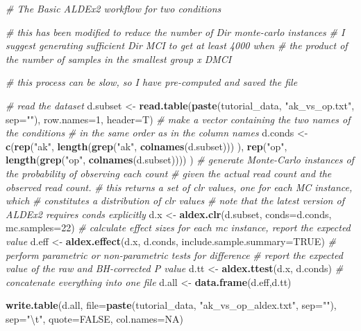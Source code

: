 \documentclass[onecolumn]{article}
\newenvironment{Shaded}{\begin{snugshade}}{\end{snugshade}}
\newcommand{\CharTok}[1]{\textcolor[rgb]{0.31,0.60,0.02}{#1}}
\newcommand{\CommentTok}[1]{\textcolor[rgb]{0.56,0.35,0.01}{\textit{#1}}}
\newcommand{\DataTypeTok}[1]{\textcolor[rgb]{0.13,0.29,0.53}{#1}}
\newcommand{\DecValTok}[1]{\textcolor[rgb]{0.00,0.00,0.81}{#1}}
\newcommand{\KeywordTok}[1]{\textcolor[rgb]{0.13,0.29,0.53}{\textbf{#1}}}
\newcommand{\NormalTok}[1]{#1}
\newcommand{\OtherTok}[1]{\textcolor[rgb]{0.56,0.35,0.01}{#1}}
\newcommand{\StringTok}[1]{\textcolor[rgb]{0.31,0.60,0.02}{#1}}
\begin{document}
\begin{Shaded}
\begin{Highlighting}[]
\CommentTok{# The Basic ALDEx2 workflow for two conditions}

\CommentTok{# this has been modified to reduce the number of Dir monte-carlo instances}
\CommentTok{# I suggest generating sufficient Dir MCI to get at least 4000 when}
\CommentTok{# the product of the number of samples in the smallest group x DMCI}

\CommentTok{# this process can be slow, so I have pre-computed and saved the file}


\CommentTok{# read the dataset}
\NormalTok{d.subset <-}\StringTok{ }\KeywordTok{read.table}\NormalTok{(}\KeywordTok{paste}\NormalTok{(tutorial_data, }\StringTok{"ak_vs_op.txt"}\NormalTok{, }\DataTypeTok{sep=}\StringTok{""}\NormalTok{),}
    \DataTypeTok{row.names=}\DecValTok{1}\NormalTok{, }\DataTypeTok{header=}\NormalTok{T)}
\CommentTok{# make a vector containing the two names of the conditions}
\CommentTok{# in the same order as in the column names}
\NormalTok{d.conds <-}\StringTok{ }\KeywordTok{c}\NormalTok{(}\KeywordTok{rep}\NormalTok{(}\StringTok{"ak"}\NormalTok{, }\KeywordTok{length}\NormalTok{(}\KeywordTok{grep}\NormalTok{(}\StringTok{"ak"}\NormalTok{, }\KeywordTok{colnames}\NormalTok{(d.subset))) ),}
    \KeywordTok{rep}\NormalTok{(}\StringTok{"op"}\NormalTok{, }\KeywordTok{length}\NormalTok{(}\KeywordTok{grep}\NormalTok{(}\StringTok{"op"}\NormalTok{, }\KeywordTok{colnames}\NormalTok{(d.subset)))) )}
\CommentTok{# generate Monte-Carlo instances of the probability of observing each count}
\CommentTok{# given the actual read count and the observed read count.}
\CommentTok{# this returns a set of clr values, one for each MC instance, which}
\CommentTok{# constitutes a distribution of clr values}
\CommentTok{# note that the latest version of ALDEx2 requires conds explicitly}
\NormalTok{d.x <-}\StringTok{ }\KeywordTok{aldex.clr}\NormalTok{(d.subset, }\DataTypeTok{conds=}\NormalTok{d.conds, }\DataTypeTok{mc.samples=}\DecValTok{22}\NormalTok{)}
\CommentTok{# calculate effect sizes for each mc instance, report the expected value}
\NormalTok{d.eff <-}\StringTok{ }\KeywordTok{aldex.effect}\NormalTok{(d.x, d.conds, }\DataTypeTok{include.sample.summary=}\OtherTok{TRUE}\NormalTok{)}
\CommentTok{# perform parametric or non-parametric tests for difference}
\CommentTok{# report the expected value of the raw and BH-corrected P value}
\NormalTok{d.tt <-}\StringTok{ }\KeywordTok{aldex.ttest}\NormalTok{(d.x, d.conds)}
\CommentTok{# concatenate everything into one file}
\NormalTok{d.all <-}\StringTok{ }\KeywordTok{data.frame}\NormalTok{(d.eff,d.tt)}

\KeywordTok{write.table}\NormalTok{(d.all, }\DataTypeTok{file=}\KeywordTok{paste}\NormalTok{(tutorial_data, }\StringTok{"ak_vs_op_aldex.txt"}\NormalTok{, }\DataTypeTok{sep=}\StringTok{""}\NormalTok{), }\DataTypeTok{sep=}\StringTok{"}\CharTok{\textbackslash{}t}\StringTok{"}\NormalTok{,}
    \DataTypeTok{quote=}\OtherTok{FALSE}\NormalTok{, }\DataTypeTok{col.names=}\OtherTok{NA}\NormalTok{)}
\end{Highlighting}
\end{Shaded}
\end{document}
